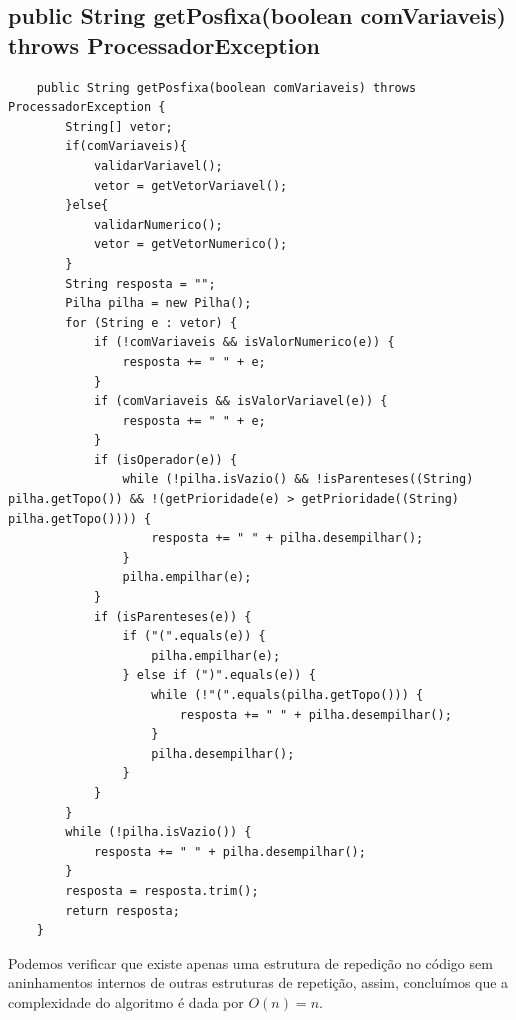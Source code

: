 \documentclass[a4paper,11pt]{article}
\begin{document}
\subsection{public String getPosfixa(boolean comVariaveis) throws ProcessadorException}
\begin{lstlisting}
    public String getPosfixa(boolean comVariaveis) throws ProcessadorException {        
        String[] vetor;       
        if(comVariaveis){
            validarVariavel();
            vetor = getVetorVariavel();
        }else{
            validarNumerico();
            vetor = getVetorNumerico();
        }       
        String resposta = "";
        Pilha pilha = new Pilha();       
        for (String e : vetor) {
            if (!comVariaveis && isValorNumerico(e)) {
                resposta += " " + e;
            }          
            if (comVariaveis && isValorVariavel(e)) {
                resposta += " " + e;
            }
            if (isOperador(e)) {
                while (!pilha.isVazio() && !isParenteses((String) pilha.getTopo()) && !(getPrioridade(e) > getPrioridade((String) pilha.getTopo()))) {
                    resposta += " " + pilha.desempilhar();
                }
                pilha.empilhar(e);
            }
            if (isParenteses(e)) {
                if ("(".equals(e)) {
                    pilha.empilhar(e);
                } else if (")".equals(e)) {
                    while (!"(".equals(pilha.getTopo())) {
                        resposta += " " + pilha.desempilhar();
                    }
                    pilha.desempilhar();
                }
            }
        }
        while (!pilha.isVazio()) {
            resposta += " " + pilha.desempilhar();
        }      
        resposta = resposta.trim();
        return resposta;
    }
\end{lstlisting}
Podemos verificar que existe apenas uma estrutura de repedição no código sem aninhamentos internos de outras estruturas de repetição, assim, concluímos que a complexidade do algoritmo é dada por \(O(n)=n\).
\end{document}
